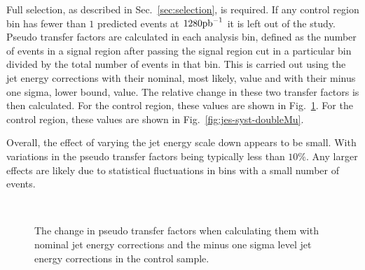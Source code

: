 Full selection, as described in Sec.~\ref{sec:selection}, is required.
If any control region bin has fewer than $1$ predicted events at
$1280\ipb$ it is left out of the study.  Pseudo transfer factors are
calculated in each analysis bin, defined as the number of events in a
signal region after passing the signal region \alphat cut in a
particular bin divided by the total number of events in that bin. This
is carried out using the jet energy corrections with their nominal,
most likely, value and with their minus one sigma, lower bound,
value. The relative change in these two transfer factors is then
calculated. For the \mj control region, these values are shown in
Fig.~\ref{fig:jes-syst-singleMu}. For the \mmj control region, these
values are shown in Fig.~\ref{fig:jes-syst-doubleMu}.

Overall, the effect of varying the jet energy scale down appears to be
small. With variations in the pseudo transfer factors being typically
less than $10\%$. Any larger effects are likely due to statistical
fluctuations in bins with a small number of events.


\begin{figure}[]
  \centering
   ~~
  \caption{\label{fig:jes-syst-singleMu} The change in pseudo transfer
  factors when calculating them with nominal jet energy corrections
  and the minus one sigma level jet energy corrections in the \mj
  control sample.}
\end{figure}

